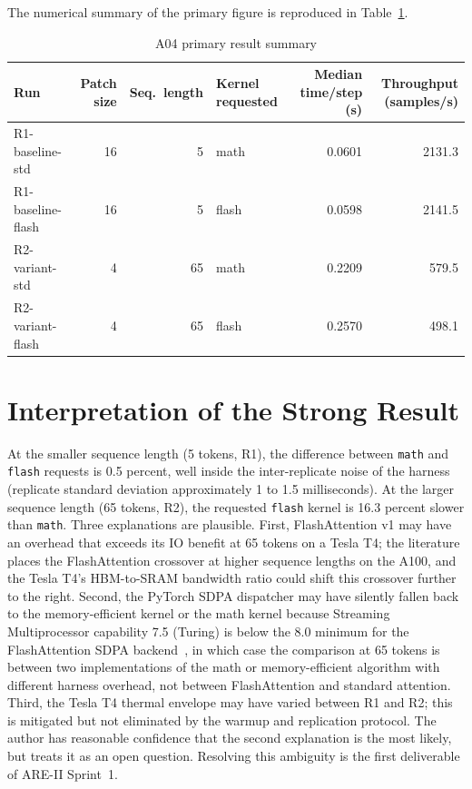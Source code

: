 \documentclass[11pt]{article}
\begin{document}
\noindent The numerical summary of the primary figure is reproduced in Table~\ref{tab:a04-summary}.

\begin{table}[h!]
\centering
\caption{A04 primary result summary}
\label{tab:a04-summary}
\small
\begin{tabularx}{\textwidth}{l r r X r r}
\toprule
\textbf{Run} & \textbf{Patch size} & \textbf{Seq.\ length} & \textbf{Kernel requested} & \textbf{Median time/step (s)} & \textbf{Throughput (samples/s)} \\
\midrule
R1-baseline-std   & 16 &  5 & math  & 0.0601 & 2131.3 \\
R1-baseline-flash & 16 &  5 & flash & 0.0598 & 2141.5 \\
R2-variant-std    &  4 & 65 & math  & 0.2209 &  579.5 \\
R2-variant-flash  &  4 & 65 & flash & 0.2570 &  498.1 \\
\bottomrule
\end{tabularx}
\end{table}

\section{Interpretation of the Strong Result}

At the smaller sequence length (5 tokens, R1), the difference between \texttt{math} and \texttt{flash} requests is 0.5 percent, well inside the inter-replicate noise of the harness (replicate standard deviation approximately 1 to 1.5 milliseconds). At the larger sequence length (65 tokens, R2), the requested \texttt{flash} kernel is 16.3 percent slower than \texttt{math}. Three explanations are plausible. First, FlashAttention v1 may have an overhead that exceeds its IO benefit at 65 tokens on a Tesla T4; the literature places the FlashAttention crossover at higher sequence lengths on the A100, and the Tesla T4's HBM-to-SRAM bandwidth ratio could shift this crossover further to the right. Second, the PyTorch SDPA dispatcher may have silently fallen back to the memory-efficient kernel or the math kernel because Streaming Multiprocessor capability 7.5 (Turing) is below the 8.0 minimum for the FlashAttention SDPA backend~\parencite{pytorch2024sdpa}, in which case the comparison at 65 tokens is between two implementations of the math or memory-efficient algorithm with different harness overhead, not between FlashAttention and standard attention. Third, the Tesla T4 thermal envelope may have varied between R1 and R2; this is mitigated but not eliminated by the warmup and replication protocol. The author has reasonable confidence that the second explanation is the most likely, but treats it as an open question. Resolving this ambiguity is the first deliverable of ARE-II Sprint~1.
\end{document}
